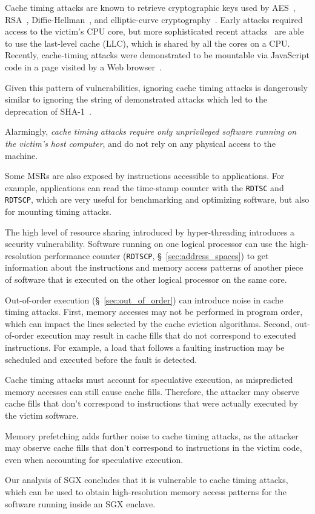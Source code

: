 Cache timing attacks are known to retrieve cryptographic keys used by
AES~\cite{bonneau2006aes}, RSA~\cite{brumley2005rsa},
Diffie-Hellman~\cite{kocher1996timing}, and elliptic-curve
cryptography~\cite{brumley2011ecc}.
Early attacks required access to the victim's CPU core, but more sophisticated
recent attacks~\cite{yarom2013llctiming, liu2015llctiming} are able to use the
last-level cache (LLC), which is shared by all the cores on a CPU. Recently,
cache-timing attacks were demonstrated to be mountable via JavaScript code in a
page visited by a Web browser~\cite{oren2015jstiming}.

Given this pattern of vulnerabilities, ignoring cache timing attacks is
dangerously similar to ignoring the string of demonstrated attacks which led to
the deprecation of SHA-1~\cite{nist2014sha1policy, google2014sha1deprecation,
microsoft2014sha1deprecation}.

Alarmingly, {\em cache timing attacks require only unprivileged software
running on the victim's host computer}, and do not rely on any physical
access to the machine.

Some MSRs are also
exposed by instructions accessible to applications. For example, applications
can read the time-stamp counter with the \texttt{RDTSC} and \texttt{RDTSCP},
which are very useful for benchmarking and optimizing software, but also for
mounting timing attacks.

The high level of resource sharing introduced by hyper-threading introduces a
security vulnerability. Software running on one logical processor can use the
high-resolution performance counter (\texttt{RDTSCP},
\S~\ref{sec:address_spaces}) \cite{petters1999making} to get information about
the instructions and memory access patterns of another piece of software that
is executed on the other logical processor on the same core.

Out-of-order execution (\S~\ref{sec:out_of_order}) can introduce noise in cache
timing attacks. First, memory accesses may not be performed in program order,
which can impact the lines selected by the cache eviction algorithms. Second,
out-of-order execution may result in cache fills that do not correspond to
executed instructions. For example, a load that follows a faulting instruction
may be scheduled and executed before the fault is detected.

Cache timing attacks must account for speculative execution, as mispredicted
memory accesses can still cause cache fills. Therefore, the attacker may
observe cache fills that don't correspond to instructions that were actually
executed by the victim software.

Memory prefetching adds further noise to cache timing attacks, as the attacker
may observe cache fills that don't correspond to instructions in the victim
code, even when accounting for speculative execution.

Our analysis of SGX concludes that it is vulnerable to cache timing attacks,
which can be used to obtain high-resolution memory access patterns for the
software running inside an SGX enclave.
